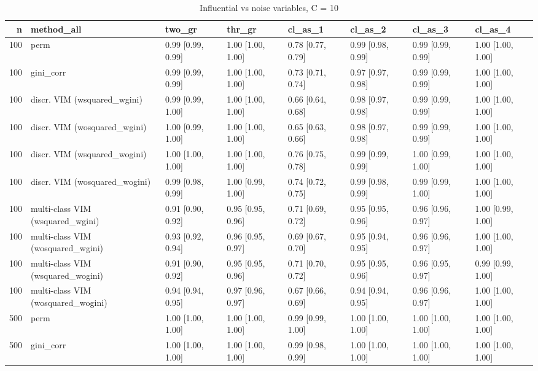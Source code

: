 \begin{table}[ht]
\centering
\caption{Influential vs noise variables, C = 10} 
\begin{tabular}{rlllllll}
  \hline
n & method\_all & two\_gr & thr\_gr & cl\_as\_1 & cl\_as\_2 & cl\_as\_3 & cl\_as\_4 \\ 
  \hline
100 & perm & 0.99 [0.99, 0.99] & 1.00 [1.00, 1.00] & 0.78 [0.77, 0.79] & 0.99 [0.98, 0.99] & 0.99 [0.99, 0.99] & 1.00 [1.00, 1.00] \\ 
  100 & gini\_corr & 0.99 [0.99, 0.99] & 1.00 [1.00, 1.00] & 0.73 [0.71, 0.74] & 0.97 [0.97, 0.98] & 0.99 [0.99, 0.99] & 1.00 [1.00, 1.00] \\ 
  100 & discr. VIM (wsquared\_wgini) & 0.99 [0.99, 1.00] & 1.00 [1.00, 1.00] & 0.66 [0.64, 0.68] & 0.98 [0.97, 0.98] & 0.99 [0.99, 0.99] & 1.00 [1.00, 1.00] \\ 
  100 & discr. VIM (wosquared\_wgini) & 1.00 [0.99, 1.00] & 1.00 [1.00, 1.00] & 0.65 [0.63, 0.66] & 0.98 [0.97, 0.98] & 0.99 [0.99, 0.99] & 1.00 [1.00, 1.00] \\ 
  100 & discr. VIM (wsquared\_wogini) & 1.00 [1.00, 1.00] & 1.00 [1.00, 1.00] & 0.76 [0.75, 0.78] & 0.99 [0.99, 0.99] & 1.00 [0.99, 1.00] & 1.00 [1.00, 1.00] \\ 
  100 & discr. VIM (wosquared\_wogini) & 0.99 [0.98, 0.99] & 1.00 [0.99, 1.00] & 0.74 [0.72, 0.75] & 0.99 [0.98, 0.99] & 0.99 [0.99, 1.00] & 1.00 [1.00, 1.00] \\ 
  100 & multi-class VIM (wsquared\_wgini) & 0.91 [0.90, 0.92] & 0.95 [0.95, 0.96] & 0.71 [0.69, 0.72] & 0.95 [0.95, 0.96] & 0.96 [0.96, 0.97] & 1.00 [0.99, 1.00] \\ 
  100 & multi-class VIM (wosquared\_wgini) & 0.93 [0.92, 0.94] & 0.96 [0.95, 0.97] & 0.69 [0.67, 0.70] & 0.95 [0.94, 0.95] & 0.96 [0.96, 0.97] & 1.00 [1.00, 1.00] \\ 
  100 & multi-class VIM (wsquared\_wogini) & 0.91 [0.90, 0.92] & 0.95 [0.95, 0.96] & 0.71 [0.70, 0.72] & 0.95 [0.95, 0.96] & 0.96 [0.95, 0.97] & 0.99 [0.99, 1.00] \\ 
  100 & multi-class VIM (wosquared\_wogini) & 0.94 [0.94, 0.95] & 0.97 [0.96, 0.97] & 0.67 [0.66, 0.69] & 0.94 [0.94, 0.95] & 0.96 [0.96, 0.97] & 1.00 [1.00, 1.00] \\ 
   \hline 500 & perm & 1.00 [1.00, 1.00] & 1.00 [1.00, 1.00] & 0.99 [0.99, 1.00] & 1.00 [1.00, 1.00] & 1.00 [1.00, 1.00] & 1.00 [1.00, 1.00] \\ 
  500 & gini\_corr & 1.00 [1.00, 1.00] & 1.00 [1.00, 1.00] & 0.99 [0.98, 0.99] & 1.00 [1.00, 1.00] & 1.00 [1.00, 1.00] & 1.00 [1.00, 1.00] \\ 

\end{tabular}
\end{table}
